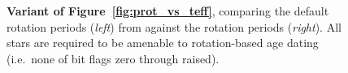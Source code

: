 \documentclass[11pt,twocolumn,tighten,linenumbers,trackchanges]{aastex63}
\begin{document}
\begin{figure}[!t]
	\begin{center}
	\end{center}
	\vspace{-0.5cm}
	\caption{
    {\bf Variant of Figure~\ref{fig:prot_vs_teff}}, comparing the default
    rotation periods ({\it left}) from \citet{Santos_2019,Santos_2021}
    against the \citet{McQuillan_2014} rotation periods ({\it right}).
    All stars are required to be amenable to rotation-based age dating
    (i.e.~none of bit flags zero through  raised).
	}
	\label{fig:prot_vs_teff_mcq}
\end{figure}
\end{document}
